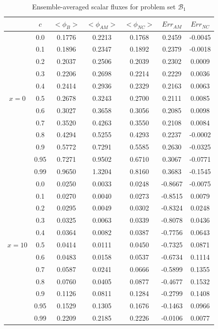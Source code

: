 \documentclass[12pt]{article}
\newcommand{\bl}{\big<}
\newcommand{\bg}{\big>}
\newcommand{\setb}{\mathcal{B}}
\begin{document}
{\begin{table}[p]
\centering
\caption{Ensemble-averaged scalar fluxes for problem set $\setb_1$}
\label{tab5} 
\begin{tabular}{||c|c||c|c|c||c|c||} \hline \hline
  & $c$ & $\bl\phi_B\bg$ & $\bl\phi_{AM}\bg$ &$\bl\phi_{NC}\bg$ & $Err_{AM}$ & $ Err_{NC}$\\ \hline\hline
& 0.0 & 0.1776 & 0.2213 & 0.1768 & 0.2459 & -0.0045 \\
\cline{2-7}
& 0.1 & 0.1896 & 0.2347 & 0.1892 & 0.2379 & -0.0018 \\
\cline{2-7}
& 0.2 & 0.2037 & 0.2506 & 0.2039 & 0.2302 & 0.0009 \\
\cline{2-7}
& 0.3 & 0.2206 & 0.2698 & 0.2214 & 0.2229 & 0.0036 \\
\cline{2-7}
& 0.4 & 0.2414 & 0.2936 & 0.2329 & 0.2163 & 0.0063 \\
\cline{2-7}
$x=0$ & 0.5 & 0.2678 & 0.3243 & 0.2700 & 0.2111 & 0.0085 \\
\cline{2-7}
& 0.6 & 0.3027 & 0.3658 & 0.3056 & 0.2085 & 0.0098 \\
\cline{2-7}
& 0.7 & 0.3520 & 0.4263 & 0.3550 & 0.2108 & 0.0084 \\
\cline{2-7}
& 0.8 & 0.4294 & 0.5255 & 0.4293 & 0.2237 & -0.0002\\
\cline{2-7}
& 0.9 & 0.5772 & 0.7291 & 0.5585 & 0.2630 & -0.0325 \\
\cline{2-7}
& 0.95 & 0.7271 & 0.9502 & 0.6710 & 0.3067 & -0.0771\\
\cline{2-7}
& 0.99 & 0.9650 & 1.3204 & 0.8160 & 0.3683 & -0.1545 \\
\hline\hline
& 0.0 & 0.0250 & 0.0033 & 0.0248 & -0.8667 & -0.0075 \\
\cline{2-7}
& 0.1 & 0.0270 & 0.0040 & 0.0273 & -0.8515 & 0.0079 \\
\cline{2-7}
& 0.2 & 0.0295 & 0.0049 & 0.0302 & -0.8324 & 0.0248 \\
\cline{2-7}
& 0.3 & 0.0325 & 0.0063 & 0.0339 & -0.8078 & 0.0436 \\
\cline{2-7}
& 0.4 & 0.0364 & 0.0082 & 0.0387 & -0.7756 & 0.0643 \\
\cline{2-7}
$x=10$ & 0.5 & 0.0414 & 0.0111 & 0.0450 & -0.7325 & 0.0871 \\
\cline{2-7}
& 0.6 & 0.0483 & 0.0158 & 0.0537 & -0.6734 & 0.1114 \\
\cline{2-7}
& 0.7 & 0.0587 & 0.0241 & 0.0666 & -0.5899 & 0.1355 \\
\cline{2-7}
& 0.8 & 0.0760 & 0.0405 & 0.0877 & -0.4677 & 0.1532 \\
\cline{2-7}
& 0.9 & 0.1126 & 0.0811 & 0.1284 & -0.2799 & 0.1408 \\
\cline{2-7}
& 0.95 & 0.1529 & 0.1305 & 0.1676 & -0.1463 & 0.0966 \\
\cline{2-7}
& 0.99 & 0.2209 & 0.2185 & 0.2226 & -0.0106 & 0.0077\\
\hline\hline
  \end{tabular}
\end{table}





}
\end{document}

